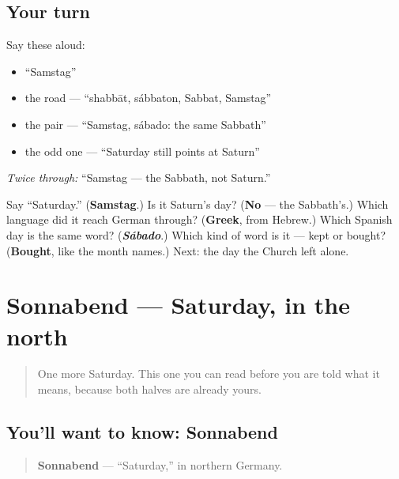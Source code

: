 \subsection*{Your turn}
Say these aloud:

\begin{itemize}
\raggedright
  \item \textquotedblleft{}Samstag\textquotedblright{}
  \item the road — \textquotedblleft{}shabbāt, sábbaton, Sabbat, Samstag\textquotedblright{}
  \item the pair — \textquotedblleft{}Samstag, sábado: the same Sabbath\textquotedblright{}
  \item the odd one — \textquotedblleft{}Saturday still points at Saturn\textquotedblright{}
\end{itemize}

\emph{Twice through:} \textquotedblleft{}Samstag — the Sabbath, not Saturn.\textquotedblright{}

\begin{tcolorbox}[breakable,colback=teal!4,colframe=teal!35!black,title={Before you move on}]
Say \textquotedblleft{}Saturday.\textquotedblright{} (\textbf{Samstag}.) Is it Saturn's day? (\textbf{No} — the Sabbath's.) Which language did it reach German through? (\textbf{Greek}, from Hebrew.) Which Spanish day is the same word? (\emph{\textbf{Sábado}}.) Which kind of word is it — kept or bought? (\textbf{Bought}, like the month names.) Next: the day the Church left alone.
\end{tcolorbox}
\section[Sonnabend]{Sonnabend — Saturday, in the north}

\label{lesson:GE-C07-sonnabend}



\begin{quote}
One more Saturday. This one you can read before you are told what it means, because both halves are already yours.
\end{quote}

\subsection*{You'll want to know: Sonnabend}
\begin{quote}
\textbf{Sonnabend} — \textquotedblleft{}Saturday,\textquotedblright{} in northern Germany.
\end{quote}


